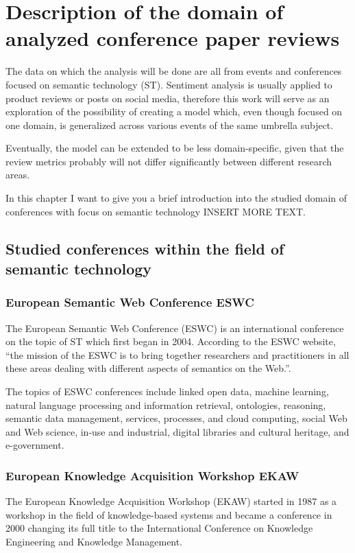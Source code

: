 \chapter{Description of the domain of analyzed conference paper reviews}
The data on which the analysis will be done are all from events and conferences focused on semantic technology (ST). Sentiment analysis is usually applied to product reviews or posts on social media, therefore this work will serve as an exploration of the possibility of creating a  model which, even though focused on one domain, is generalized  across various events of the same umbrella subject.

Eventually, the model can be extended to be less domain-specific, given that the review metrics probably will not differ significantly between different research areas. 

In this chapter I want to give you a brief introduction into the studied domain of conferences with focus on semantic technology INSERT MORE TEXT.

\section{Studied conferences within the field of semantic technology}
\subsection{European Semantic Web Conference ESWC}
The European Semantic Web Conference (ESWC) is an international conference on the topic of ST which first began in 2004.
According to the ESWC website, ``the mission of the ESWC is to bring together researchers and practitioners in all these areas dealing with different aspects of semantics on the Web.''\cite{eswc}.

The topics of ESWC conferences include linked open data, machine learning, natural language processing and information retrieval, ontologies, reasoning, semantic data management, services, processes, and cloud computing, social Web and Web science, in-use and industrial, digital libraries and cultural heritage, and e-government.\cite{eswc_topics}
\subsection{European Knowledge Acquisition Workshop EKAW}
The European Knowledge Acquisition Workshop (EKAW) started in 1987 as a workshop in the field of knowledge-based systems and became a conference in 2000 changing its full title to the International Conference on Knowledge Engineering and Knowledge Management.\cite{ekaw}

